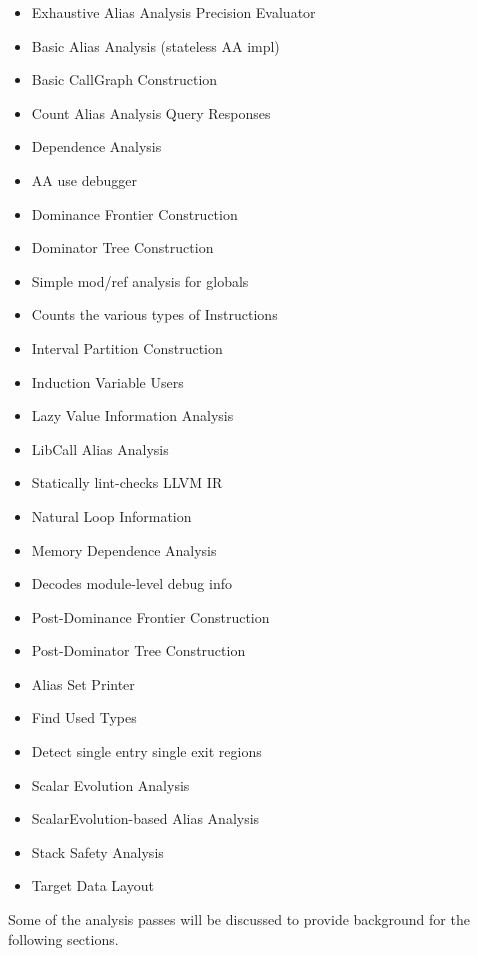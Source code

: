 \begin{multicols}{3}
\begin{itemize}
\scriptsize
     \item Exhaustive Alias Analysis Precision Evaluator
     \item Basic Alias Analysis (stateless AA impl)
     \item Basic CallGraph Construction
     \item Count Alias Analysis Query Responses
     \item Dependence Analysis
     \item AA use debugger
     \item Dominance Frontier Construction
     \item Dominator Tree Construction
     \item Simple mod/ref analysis for globals
     \item Counts the various types of Instructions
     \item Interval Partition Construction
     \item Induction Variable Users
     \item Lazy Value Information Analysis
     \item LibCall Alias Analysis
     \item Statically lint-checks LLVM IR
     \item Natural Loop Information
     \item Memory Dependence Analysis
     \item Decodes module-level debug info
     \item Post-Dominance Frontier Construction
     \item Post-Dominator Tree Construction
     \item Alias Set Printer
     \item Find Used Types
     \item Detect single entry single exit regions
     \item Scalar Evolution Analysis
     \item ScalarEvolution-based Alias Analysis
     \item Stack Safety Analysis
     \item Target Data Layout

\end{itemize}
\end{multicols}

Some of the analysis passes will be discussed to provide background for the following sections.

